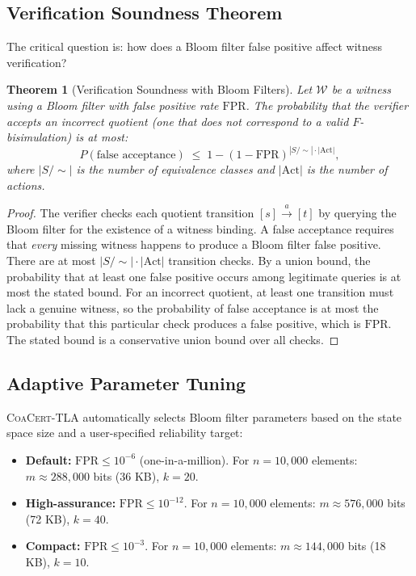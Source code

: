 \documentclass[11pt]{article}
\newtheorem{theorem}{Theorem}
\newcommand{\Act}{\ensuremath{\mathrm{Act}}}
\newcommand{\CoaCert}{\textsc{CoaCert-TLA}}
\newcommand{\FPR}{\ensuremath{\mathrm{FPR}}}
\begin{document}
\subsection{Verification Soundness Theorem}

The critical question is: how does a Bloom filter false positive affect
witness verification?

\begin{theorem}[Verification Soundness with Bloom Filters]
\label{thm:bloom-sound}
Let $\mathcal{W}$ be a witness using a Bloom filter with false positive
rate $\FPR$.
The probability that the verifier accepts an \emph{incorrect} quotient
(one that does not correspond to a valid $F$-bisimulation) is at most:
\begin{equation}\label{eq:bloom-sound}
  P(\text{false acceptance}) \;\leq\; 1 - (1 - \FPR)^{|S/{\sim}| \cdot |\Act|},
\end{equation}
where $|S/{\sim}|$ is the number of equivalence classes and $|\Act|$ is the
number of actions.
\end{theorem}

\begin{proof}
The verifier checks each quotient transition $[s] \xrightarrow{a} [t]$
by querying the Bloom filter for the existence of a witness binding.
A false acceptance requires that \emph{every} missing witness happens to
produce a Bloom filter false positive.
There are at most $|S/{\sim}| \cdot |\Act|$ transition checks.
By a union bound, the probability that at least one false positive occurs
among legitimate queries is at most the stated bound.
For an incorrect quotient, at least one transition must lack a genuine
witness, so the probability of false acceptance is at most the probability
that this particular check produces a false positive, which is $\FPR$.
The stated bound is a conservative union bound over all checks.
\end{proof}

\subsection{Adaptive Parameter Tuning}

\CoaCert{} automatically selects Bloom filter parameters based on the
state space size and a user-specified reliability target:

\begin{itemize}[nosep]
\item \textbf{Default:} $\FPR \leq 10^{-6}$ (one-in-a-million).
  For $n = 10{,}000$ elements: $m \approx 288{,}000$ bits (36 KB),
  $k = 20$.
\item \textbf{High-assurance:} $\FPR \leq 10^{-12}$.
  For $n = 10{,}000$ elements: $m \approx 576{,}000$ bits (72 KB),
  $k = 40$.
\item \textbf{Compact:} $\FPR \leq 10^{-3}$.
  For $n = 10{,}000$ elements: $m \approx 144{,}000$ bits (18 KB),
  $k = 10$.
\end{itemize}
\end{document}
